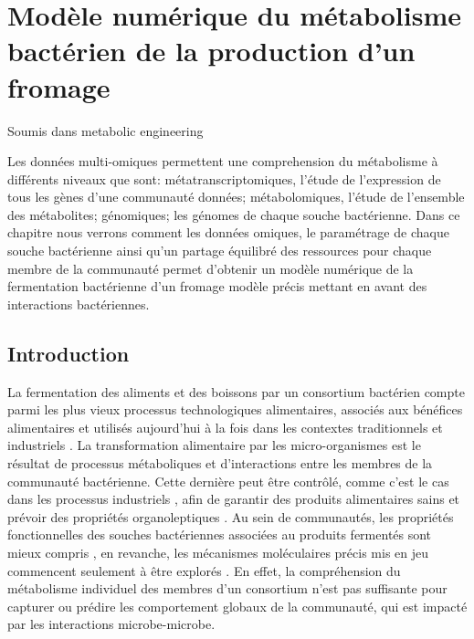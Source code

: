 \documentclass[../main.tex]{subfiles}
\begin{document}
 \fi


\chapter{Modèle numérique du métabolisme bactérien de la production d'un fromage}
\label{tango}
\minitoc
Soumis dans metabolic engineering 

\doublespacing %

\newpage

Les données multi-omiques permettent une comprehension du métabolisme à différents niveaux que sont: métatranscriptomiques, l'étude de l'expression de tous les gènes d'une communauté données; métabolomiques, l'étude de l'ensemble des métabolites; génomiques; les génomes de chaque souche bactérienne. Dans ce chapitre nous verrons comment les données omiques, le paramétrage de chaque souche bactérienne ainsi qu'un partage équilibré des ressources pour chaque membre de la communauté permet d'obtenir un modèle numérique de la fermentation bactérienne d'un fromage modèle précis mettant en avant des interactions bactériennes. 

\section{Introduction}

La fermentation des aliments et des boissons par un consortium bactérien compte parmi les plus vieux processus technologiques alimentaires, associés aux bénéfices alimentaires et utilisés aujourd'hui à la fois dans les contextes traditionnels et industriels \citep*{Tamang2016,Tamang.2016_Functional}. La transformation alimentaire par les micro-organismes est le résultat de processus métaboliques et d'interactions entre les membres de la communauté bactérienne. Cette dernière peut être contrôlé, comme c'est le cas dans les processus industriels \citep{Somerville.2021}, afin de garantir des produits alimentaires sains et prévoir des propriétés organoleptiques \citep{Galimberti.2021}. Au sein de communautés, les propriétés fonctionnelles des souches bactériennes associées au produits fermentés sont mieux compris \citep{Tamang.2016_Functional}, en revanche, les mécanismes moléculaires précis mis en jeu commencent seulement à être explorés \citep{Blasche.2021}. En effet, la compréhension du métabolisme individuel des membres d'un consortium n'est pas suffisante pour capturer ou prédire les comportement globaux de la communauté, qui est impacté par les interactions microbe-microbe.
\end{document}
